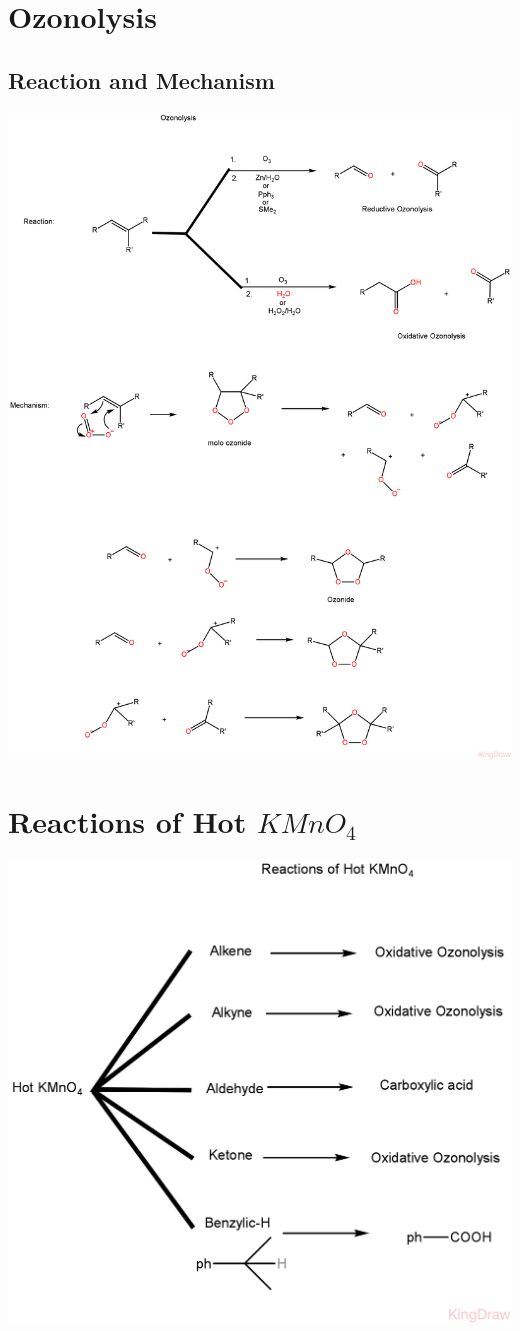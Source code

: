 \documentclass{article}
\begin{document}
\section{Ozonolysis}
\subsection{Reaction and Mechanism}
\includegraphics[scale=0.159]{ozono_1723144362447.PNG}
\section{Reactions of Hot $KMnO_{4}$}
\includegraphics[scale=0.25]{rxofhotKMnO4_1723157430331.PNG}
\end{document}
